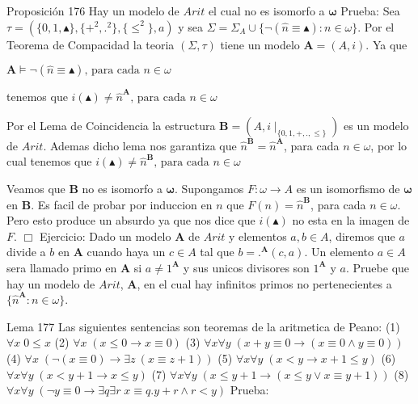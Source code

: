 Proposición 176 Hay un modelo de \(Arit\) el cual no es isomorfo a \(\mathbf{\omega }\)
Prueba: Sea \(\tau =(\{0,1,\blacktriangle \},\{+^{2},.^{2}\},\{\leq ^{2}\},a)\) y sea \( \Sigma =\Sigma _{A}\cup \{\lnot (\widehat{n}\equiv \blacktriangle ):n\in \omega \}\). Por el Teorema de Compacidad la teoria \((\Sigma ,\tau )\) tiene un modelo \(\mathbf{A}=(A,i)\). Ya que

\(\displaystyle \mathbf{A}\vDash \lnot (\widehat{n}\equiv \blacktriangle )\text{, para cada } n\in \omega \)

tenemos que
\(\displaystyle i(\blacktriangle )\neq \widehat{n}^{\mathbf{A}}\text{, para cada }n\in \omega \)

Por el Lema de Coincidencia la estructura \(\mathbf{B}=(A,i\mid _{\{0,1,+,.,\leq \}})\) es un modelo de \(Arit\). Ademas dicho lema nos garantiza que \(\widehat{n}^{\mathbf{B}}=\widehat{n}^{\mathbf{A}}\), para cada \(n\in \omega \), por lo cual tenemos que
\(\displaystyle i(\blacktriangle )\neq \widehat{n}^{\mathbf{B}}\text{, para cada }n\in \omega \)

Veamos que \(\mathbf{B}\) no es isomorfo a \(\mathbf{\omega }\). Supongamos \( F:\omega \rightarrow A\) es un isomorfismo de \(\mathbf{\omega }\) en \(\mathbf{B }\). Es facil de probar por induccion en \(n\) que \(F(n)=\widehat{n}^{\mathbf{B} }\), para cada \(n\in \omega \). Pero esto produce un absurdo ya que nos dice que \(i(\blacktriangle )\) no esta en la imagen de \(F\). \(\Box\)
Ejercicio: Dado un modelo \(\mathbf{A}\) de \(Arit\) y elementos \( a,b\in A\), diremos que \(a\) divide a \(b\) en \(\mathbf{A}\) cuando haya un \(c\in A\) tal que \(b=.^{\mathbf{A}}(c,a).\) Un elemento \(a\in A\) sera llamado primo en \(\mathbf{A}\) si \(a\neq 1^{\mathbf{A} }\) y sus unicos divisores son \(1^{\mathbf{A}}\) y \(a\). Pruebe que hay un modelo de \(Arit\), \(\mathbf{A}\), en el cual hay infinitos primos no pertenecientes a \(\{\widehat{n}^{\mathbf{A}}:n\in \omega \}\).

Lema 177 Las siguientes sentencias son teoremas de la aritmetica de Peano:
(1) \(\forall x\;0\leq x\)
(2) \(\forall x\;(x\leq 0\rightarrow x\equiv 0)\)
(3) \(\forall x\forall y\;(x+y\equiv 0\rightarrow (x\equiv 0\wedge y\equiv 0))\)
(4) \(\forall x\;(\lnot (x\equiv 0)\rightarrow \exists z\ (x\equiv z+1))\)
(5) \(\forall x\forall y\;(x< y\rightarrow x+1\leq y)\)
(6) \(\forall x\forall y\;(x< y+1\rightarrow x\leq y)\)
(7) \(\forall x\forall y\;(x\leq y+1\rightarrow (x\leq y\vee x\equiv y+1))\)
(8) \(\forall x\forall y\;(\lnot y\equiv 0\rightarrow \exists q\exists r\;x\equiv q.y+r\wedge r< y)\)
Prueba:

